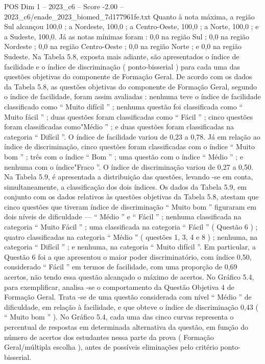 \begin{textsample}{POS Dim 1 – 2023\_c6 – Score -2.00 – 2023\_c6/enade\_2023\_biomed\_7d177961fe.txt}
Quanto à nota máxima, a região Sul alcançou 100,0 ; a Nordeste, 100,0 ; a Centro-Oeste, 100,0 ; a Norte, 100,0 ; e a Sudeste, 100,0.
Já as notas mínimas foram : 0,0 na região Sul ; 0,0 na região Nordeste ; 0,0 na região Centro-Oeste ; 0,0 na região Norte ; e 0,0 na região Sudeste.
Na Tabela 5.8, exposta mais adiante, são apresentados o índice de facilidade e o índice de discriminação ( ponto-bisserial ) para cada uma das questões objetivas do componente de Formação Geral.
De acordo com os dados da Tabela 5.8, as questões objetivas do componente de Formação Geral, segundo o índice de facilidade, foram assim avaliadas : nenhuma teve o índice de facilidade classificado como “ Muito difícil ” ; nenhuma questão foi classificada como “ Muito fácil ” ; duas questões foram classificadas como “ Fácil ” ; cinco questões foram classificadas como"Médio ” ; e duas questões foram classificadas na categoria “ Difícil ”.
O índice de facilidade variou de 0,23 a 0,78.
Já em relação ao índice de discriminação, cinco questões foram classificadas com o índice “ Muito bom ” ; três com o índice “ Bom ” ; uma questão com o índice “ Médio ” ; e nenhuma com o índice"Fraco ”.
O índice de discriminação variou de 0,27 a 0,50.
Na Tabela 5.9, é apresentada a distribuição das questões, levando -se em conta, simultaneamente, a classificação dos dois índices.
Os dados da Tabela 5.9, em conjunto com os dados relativos às questões objetivas da Tabela 5.8, atestam que cinco questões que tiveram índice de discriminação “ Muito bom ” figuraram em dois níveis de dificuldade — “ Médio ” e “ Fácil ” ; nenhuma classificada na categoria “ Muito Fácil ” ; uma classificada na categoria “ Fácil ” ( Questão 6 ) ; quatro classificadas na categoria “ Médio ” ( questões 1, 3, 4 e 8 ) ; nenhuma, na categoria “ Difícil ” ; e nenhuma, na categoria “ Muito difícil ”.
Em particular, a Questão 6 foi a que apresentou o maior poder discriminatório, com índice 0,50, considerado “ Fácil ” em termos de facilidade, com uma proporção de 0,69 acertos, não tendo essa questão alcançado o máximo de acertos.
No Gráfico 5.4, para exemplificar, analisa -se o comportamento da Questão Objetiva 4 de Formação Geral.
Trata -se de uma questão considerada com nível “ Médio ” de dificuldade, em relação à facilidade, e que obteve o índice de discriminação 0,43 ( “ Muito bom ” ).
No Gráfico 5.4, cada uma das cinco curvas representa o percentual de respostas em determinada alternativa da questão, em função do número de acertos dos estudantes nessa parte da prova ( Formação Geral/múltipla escolha ), antes de possíveis eliminações pelo critério ponto-bisserial.

\end{textsample}
